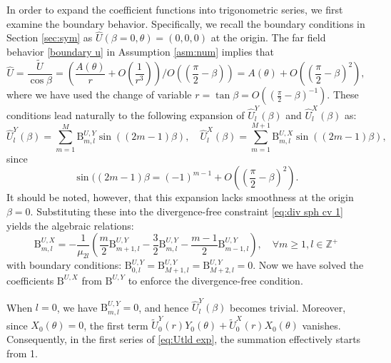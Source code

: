 \documentclass[11pt,a4paper]{article}
\numberwithin{equation}{section}
\newcommand{\Beta}{\mathrm{B}}
\begin{document}
In order to expand the coefficient functions into trigonometric series, we first examine the boundary behavior. Specifically, we recall the boundary conditions in Section 
\ref{sec:sym} as $\widehat{U} (\beta = 0, \theta) = (0, 0, 0)$ at the origin. The far field behavior \eqref{boundary u} in Assumption \ref{asm:num} implies that
\[
    \widehat{U} = \frac{\widetilde{U}}{\cos \beta}  = (\frac{A(\theta)}{r} + O(\frac{1}{r^3})) / O((\frac{\pi}{2}-\beta)) = A(\theta) + O((\frac{\pi}{2}-\beta)^2),
\]
where we have used the change of variable $r=\tan \beta = O((\frac{\pi}{2}-\beta)^{-1})$. These conditions lead naturally to the following expansion of $\widehat{U}_l^Y
(\beta)$ and $\widehat{U}_l^X (\beta)$ as:
\begin{equation}
  \widehat{U}_l^Y (\beta) = \sum_{m = 1}^M \Beta^{U, Y}_{m, l} \sin ((2 m - 1)
  \beta), \quad \widehat{U}_l^X (\beta) = \sum_{m = 1}^{M + 1} \Beta^{U, X}_{m, l}
  \sin ((2 m - 1) \beta), \label{eq:U1 ansatz 1}
\end{equation}
since 
\[
 \sin ((2 m - 1) \beta = (-1)^{m-1} + O((\frac{\pi}{2}-\beta)^2).
\]
It should be noted, however, that this expansion lacks smoothness at the origin $\beta=0$. Substituting these into the divergence-free constraint \eqref{eq:div sph cv 1}
yields the algebraic relations:
\begin{equation}
  \Beta^{U, X}_{m, l} = - \frac{1}{\mu_{2 l}}  \left( \frac{m}{2} \Beta^{U,
  Y}_{m + 1, l} - \frac{3}{2} \Beta^{U, Y}_{m, l} - \frac{m - 1}{2} \Beta^{U,
  Y}_{m - 1, l} \right), \quad \forall m \geqslant 1, l \in \mathbb{Z}^+
  \label{eq:div sph cv 2}
\end{equation}
with boundary conditions: $\Beta^{U, Y}_{0, l} = \Beta^{U, Y}_{M + 1, l} =
\Beta^{U, Y}_{M + 2, l} = 0$. Now we have solved the coefficients  $\Beta^{U, X}$ from $\Beta^{U, Y}$ to enforce the divergence-free condition.

When $l = 0$, we have $\Beta^{U, Y}_{m, l} = 0$, and hence $\widehat{U}_l^Y
(\beta)$ becomes trivial. Moreover, since $X_0 (\theta) = 0$, the first term
$\widetilde{U}_0^Y (r) Y_0 (\theta) + \widetilde{U}_0^X (r) X_0 (\theta)$ vanishes.
Consequently, in the first series of \eqref{eq:Utld exp}, the summation
effectively starts from 1.
\end{document}
